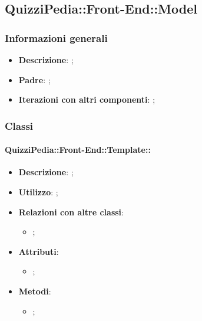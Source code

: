 \newpage

\subsection{QuizziPedia::Front-End::Model}

	\subsubsection{Informazioni generali}
		\begin{itemize}
			\item \textbf{Descrizione}: ;
			\item \textbf{Padre}: ;
			\item \textbf{Iterazioni con altri componenti}: ;
		\end{itemize}
	
	\subsubsection{Classi}
		\paragraph{QuizziPedia::Front-End::Template::}
			\begin{itemize}
				\item \textbf{Descrizione}: ;
				\item \textbf{Utilizzo}: ;
				\item \textbf{Relazioni con altre classi}: 
				\begin{itemize}
					\item ;
				\end{itemize}
				\item \textbf{Attributi}: 
				\begin{itemize}
					\item ;
				\end{itemize}
				\item \textbf{Metodi}: 
				\begin{itemize}
					\item ;
				\end{itemize}
			\end{itemize}																						
